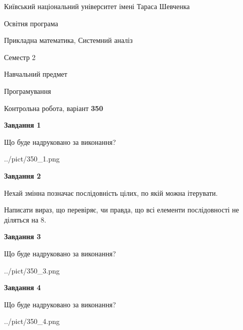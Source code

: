 \documentclass[12pt, ukrainian]{article}
\begin{document}
{{\begin {small}\par
{ \center  Київський національний університет імені Тараса Шевченка \par}
{\parbox {5 cm}{Освітня програма \hfill}{\parbox {8 cm}{Прикладна математика, Системний аналіз \hfill}}\parbox {5 cm}{\hfill Семестр 2}}\par
{\parbox {5 cm} {Навчальний предмет \hfill}\parbox {7 cm}{Програмування \hfill}\parbox {6cm}{\hfill}\par}\vspace{-7pt} \end{small}}{\center Контрольна робота, варіант  \No \textbf
{ 350 }\par}}
{
\begin {large}
{\begin {center}\textbf{Завдання 1}\end {center}}\par
Що буде надруковано за виконання?\par\par
\begin{center}
	{../pict/350_1.png}
\end{center}
\newpage

{\begin {center}\textbf{Завдання 2}\end {center}}\par
Нехай змінна  позначає послідовність цілих, по якій можна ітерувати.

Написати вираз, що перевіряє, чи правда, що всі елементи послідовності не діляться на 8.\par
\newpage

{\begin {center}\textbf{Завдання 3}\end {center}}\par
Що буде надруковано за виконання?
\begin{center}
	{../pict/350_3.png}
\end{center}
\newpage

{\begin {center}\textbf{Завдання 4}\end {center}}\par
Що буде надруковано за виконання?\par
\begin{center}
	{../pict/350_4.png}
\end{center}
\newpage


\end{large}}
\end{document}
